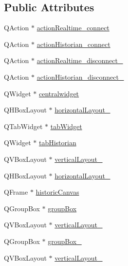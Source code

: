 \subsection*{Public Attributes}
\begin{DoxyCompactItemize}
\item 
Q\+Action $\ast$ \hyperlink{class_ui___client_view_ab5637af13c91e8eec2ab333f574419de}{action\+Realtime\+\_\+connect}
\item 
Q\+Action $\ast$ \hyperlink{class_ui___client_view_ab0d03e99eda22a508ad1b71730572012}{action\+Historian\+\_\+connect}
\item 
Q\+Action $\ast$ \hyperlink{class_ui___client_view_aad5eae02657f51e77dd7627d4d7469e6}{action\+Realtime\+\_\+disconnect\+\_}
\item 
Q\+Action $\ast$ \hyperlink{class_ui___client_view_afdc3c5739fa449540bdf53051c1ca3cd}{action\+Historian\+\_\+disconnect\+\_}
\item 
Q\+Widget $\ast$ \hyperlink{class_ui___client_view_abab1ce2b659b594baba531fcdae6bc87}{centralwidget}
\item 
Q\+H\+Box\+Layout $\ast$ \hyperlink{class_ui___client_view_a5fdaa4f48ef9495d00ac91916fdeeb82}{horizontal\+Layout\+\_}
\item 
Q\+Tab\+Widget $\ast$ \hyperlink{class_ui___client_view_a8ae60be0d2116e4b4256930f6bae8762}{tab\+Widget}
\item 
Q\+Widget $\ast$ \hyperlink{class_ui___client_view_a95f5e40e8c3d2e38e9acc567ef2fc80d}{tab\+Historian}
\item 
Q\+V\+Box\+Layout $\ast$ \hyperlink{class_ui___client_view_afaddc7ad8ce27d2a2212231f2e60d1e9}{vertical\+Layout\+\_}
\item 
Q\+H\+Box\+Layout $\ast$ \hyperlink{class_ui___client_view_a6d05cb485ccdd95c9c055e8e8b83ac56}{horizontal\+Layout\+\_}
\item 
Q\+Frame $\ast$ \hyperlink{class_ui___client_view_a7722a57944617680775c3ea9bfbfb797}{historic\+Canvas}
\item 
Q\+Group\+Box $\ast$ \hyperlink{class_ui___client_view_a46eed96a14ad721dae7862940196b453}{group\+Box}
\item 
Q\+V\+Box\+Layout $\ast$ \hyperlink{class_ui___client_view_a73aac195d597a038c596f7f3c2b66cdd}{vertical\+Layout\+\_}
\item 
Q\+Group\+Box $\ast$ \hyperlink{class_ui___client_view_aa24822bd6d8f9870252856fb270e7c81}{group\+Box\+\_}
\item 
Q\+V\+Box\+Layout $\ast$ \hyperlink{class_ui___client_view_ade7bb455e23aaeda36596c246f357459}{vertical\+Layout\+\_}

\end{DoxyCompactItemize}
